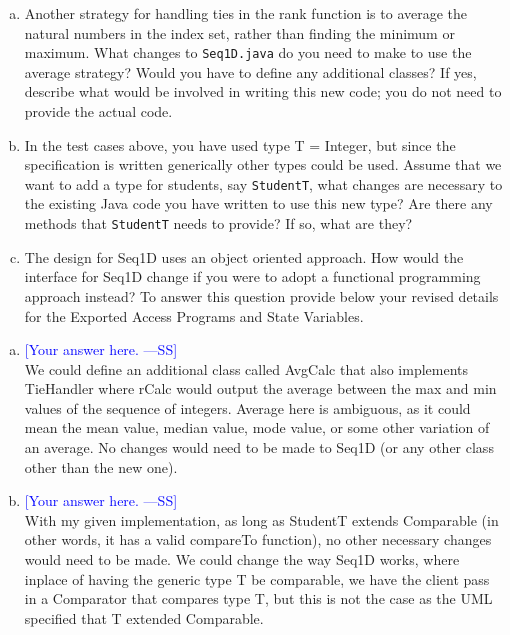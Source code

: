 \documentclass[12pt,fleqn]{examtst}
\newcommand{\authornote}[3]{\textcolor{#1}{[#3 ---#2]}}
\newcommand{\authornote}[3]{}
\newcommand{\wss}[1]{\authornote{blue}{SS}{#1}}
\begin{document}
\noindent
\begin{minipage}{\textwidth}
 \label{Q_LikelyChanges}

\begin{enumerate}[a.]
\item Another strategy for handling ties in the rank function is to average the
  natural numbers in the index set, rather than finding the minimum or maximum.
  What changes to \texttt{Seq1D.java} do you need to make to use the average
  strategy?  Would you have to define any additional classes?  If yes, describe
  what would be involved in writing this new code; you do not need to provide
  the actual code.
\item In the test cases above, you have used type T = Integer, but since the
  specification is written generically other types could be used.  Assume that
  we want to add a type for students, say \texttt{StudentT}, what changes are
  necessary to the existing Java code you have written to use this new type?
  Are there any methods that \texttt{StudentT} needs to provide?  If so, what
  are they?
\item The design for Seq1D uses an object oriented approach.  How would the
  interface for Seq1D change if you were to adopt a functional programming
  approach instead?  To answer this question provide below your revised details
  for the Exported Access Programs and State Variables.
\end{enumerate}


\begin{enumerate}[a.]
\item \wss{Your answer here.} \\
We could define an additional class called AvgCalc that also implements
TieHandler where rCalc would output the average between the max and min values
of the sequence of integers. Average here is ambiguous, as it could mean the
mean value, median value, mode value, or some other variation of an average.
No changes would need to be made to Seq1D (or any other class other than the new
one).

\item \wss{Your answer here.} \\
With my given implementation, as long as StudentT extends Comparable (in other
words, it has a valid compareTo function), no other necessary changes would need
to be made. We could change the way Seq1D works, where inplace of having the generic
type T be comparable, we have the client pass in a Comparator that compares type T,
but this is not the case as the UML specified that T extended Comparable.


\end{enumerate}
\end{minipage}
\end{document}
